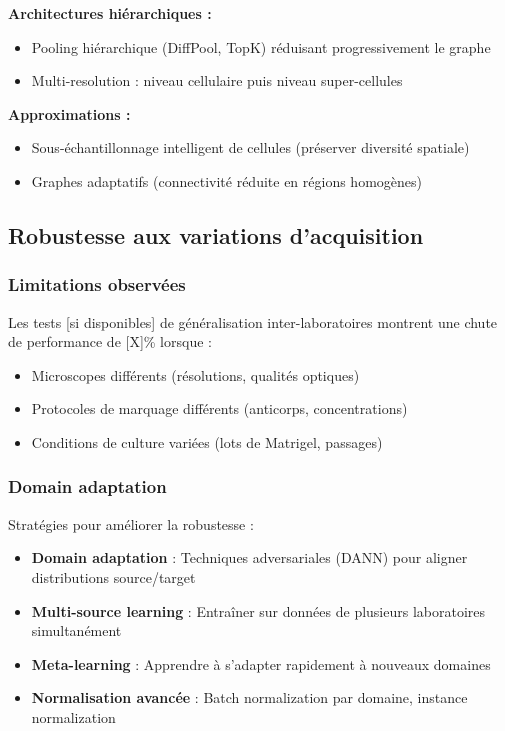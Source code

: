 \textbf{Architectures hiérarchiques :}
\begin{itemize}
    \item Pooling hiérarchique (DiffPool, TopK) réduisant progressivement le graphe
    \item Multi-resolution : niveau cellulaire puis niveau super-cellules
\end{itemize}

\textbf{Approximations :}
\begin{itemize}
    \item Sous-échantillonnage intelligent de cellules (préserver diversité spatiale)
    \item Graphes adaptatifs (connectivité réduite en régions homogènes)
\end{itemize}

\subsection{Robustesse aux variations d'acquisition}

\subsubsection{Limitations observées}

Les tests [si disponibles] de généralisation inter-laboratoires montrent une chute de performance de [X]\% lorsque :
\begin{itemize}
    \item Microscopes différents (résolutions, qualités optiques)
    \item Protocoles de marquage différents (anticorps, concentrations)
    \item Conditions de culture variées (lots de Matrigel, passages)
\end{itemize}

\subsubsection{Domain adaptation}

Stratégies pour améliorer la robustesse :
\begin{itemize}
    \item \textbf{Domain adaptation} : Techniques adversariales (DANN) pour aligner distributions source/target
    \item \textbf{Multi-source learning} : Entraîner sur données de plusieurs laboratoires simultanément
    \item \textbf{Meta-learning} : Apprendre à s'adapter rapidement à nouveaux domaines
    \item \textbf{Normalisation avancée} : Batch normalization par domaine, instance normalization
\end{itemize}

